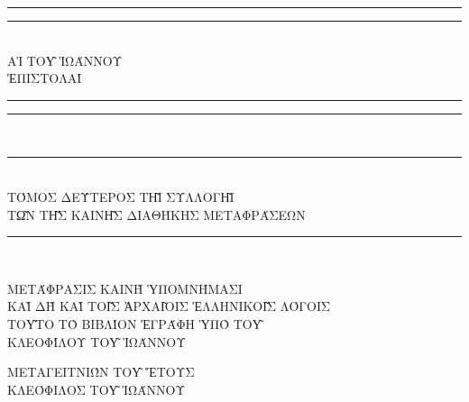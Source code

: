 \begin{doubletitle}
    \textheight
    \centering
    \vspace*{\baselineskip}
    \rule{\textwidth}{1.6pt}\vspace*{-\baselineskip}\vspace*{2pt}
    \rule{\textwidth}{0.4pt}\\[\baselineskip]
    {\uppercase{\LARGE Αἱ τοῦ Ἰωάννου \\[0.3\baselineskip]  ἐπιστολαί }}\\[0.2\baselineskip]
    \rule{\textwidth}{0.4pt}\vspace*{-\baselineskip}\vspace{3.2pt}
    \rule{\textwidth}{1.6pt}\\
    
    \scshape
    \rule{\textwidth}{0.4pt}\\[\baselineskip]
    {\Large\uppercase{Τόμος δεύτερος τῇ συλλογῇ \\ τῶν τῆς Καινῆς Διαθήκης μεταφράσεων } }\\[0.2\baselineskip]
    \rule{\textwidth}{0.4pt}\vspace*{-\baselineskip}\vspace{3.2pt}\\[\baselineskip]\vspace*{2\baselineskip}
  	  
    \uppercase{Μετάφρασις καινὴ ὑπομνήμασι \\
    καὶ δὴ καὶ τοῖς ἀρχαῖοις Ἑλληνικοῖς λόγοις} \\ 
    \vspace*{2\baselineskip}   
    \uppercase{Τοῦτο τὸ βιβλίον ἐγράφη ὑπὸ τοῦ \\[\baselineskip]
    {\Large Κλεοφίλου τοῦ Ἰωάννου}}\par
    \vfill
    {\scshape \uppercase{Μεταγειτνιών τοῦ} } \uppercase{ἔτους}  \\
    {\large \uppercase{Κλεόφιλος τοῦ Ἰωάννου}}\par
\end{doubletitle}
